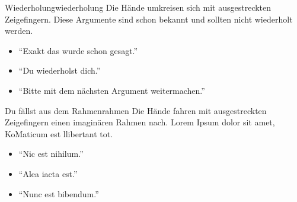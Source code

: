 \begin{handzeichen}{Wiederholung}{wiederholung}
Die Hände umkreisen sich mit ausgestreckten Zeigefingern. 
Diese Argumente sind schon bekannt und sollten nicht wiederholt werden.
\begin{itemize}
	\item \enquote{Exakt das wurde schon gesagt.}
	\item \enquote{Du wiederholst dich.}
	\item \enquote{Bitte mit dem nächsten Argument weitermachen.}
\end{itemize}
\end{handzeichen}


\begin{handzeichen}{Du fällst aus dem Rahmen}{rahmen}
Die Hände fahren mit ausgestreckten Zeigefingern einen imaginären Rahmen nach.
Lorem Ipsum dolor sit amet, KoMaticum est llibertant tot.
\begin{itemize}
	\item \enquote{Nic est nihilum.}
	\item \enquote{Alea iacta est.}
	\item \enquote{Nunc est bibendum.}
\end{itemize}
\end{handzeichen}
